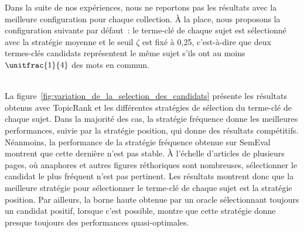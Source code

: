         Dans la suite de nos expériences, nous ne reportons pas les résultats
        avec la meilleure configuration pour chaque collection. À la place, nous
        proposons la configuration suivante par défaut~: le terme-clé de chaque
        sujet est sélectionné avec la stratégie moyenne et le seuil $\zeta$ est
        fixé à 0,25, c'est-à-dire que deux termes-clés candidats représentent le
        même sujet s'ils ont au moins $\unitfrac{1}{4}$ des mots en commun.

        ~\\La figure~\ref{fig:variation_de_la_selection_des_candidats} présente
        les résultats obtenus avec TopicRank et les différentes stratégies de
        sélection du terme-clé de chaque sujet. Dans la majorité des cas, la
        stratégie fréquence donne les meilleures performances, suivie par la
        stratégie position, qui donne des résultats compétitifs. Néanmoins, la
        performance de la stratégie fréquence obtenue sur SemEval montrent que
        cette dernière n'est pas stable. À l'échelle d'articles de
        plusieurs pages, où anaphores et autres figures
        réthoriques sont nombreuses, sélectionner le candidat le plus fréquent
        n'est pas pertinent. Les résultats montrent donc que la meilleure
        stratégie pour sélectionner le terme-clé de chaque sujet est la
        stratégie position. Par ailleurs, la borne haute obtenue par un oracle
        sélectionnant toujours un candidat positif, lorsque c'est possible, 
        montre que cette stratégie donne presque toujours des performances
        quasi-optimales.

